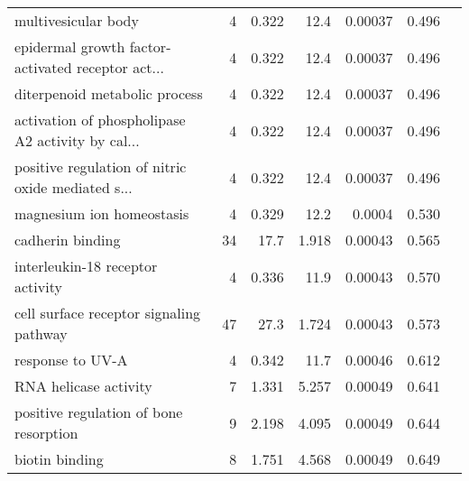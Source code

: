 \begin{longtable}{|l|r|r|r|r|r|}
                               multivesicular body &                       4 &                   0.322 &       12.4 &              0.00037 &                        0.496~~ \\
 epidermal growth factor-activated receptor act... &                       4 &                   0.322 &       12.4 &              0.00037 &                        0.496~~ \\
                     diterpenoid metabolic process &                       4 &                   0.322 &       12.4 &              0.00037 &                        0.496~~ \\
 activation of phospholipase A2 activity by cal... &                       4 &                   0.322 &       12.4 &              0.00037 &                        0.496~~ \\
 positive regulation of nitric oxide mediated s... &                       4 &                   0.322 &       12.4 &              0.00037 &                        0.496~~ \\
                         magnesium ion homeostasis &                       4 &                   0.329 &       12.2 &               0.0004 &                        0.530~~ \\
                                  cadherin binding &                      34 &                    17.7 &      1.918 &              0.00043 &                        0.565~~ \\
                  interleukin-18 receptor activity &                       4 &                   0.336 &       11.9 &              0.00043 &                        0.570~~ \\
           cell surface receptor signaling pathway &                      47 &                    27.3 &      1.724 &              0.00043 &                        0.573~~ \\
                                  response to UV-A &                       4 &                   0.342 &       11.7 &              0.00046 &                        0.612~~ \\
                             RNA helicase activity &                       7 &                   1.331 &      5.257 &              0.00049 &                        0.641~~ \\
            positive regulation of bone resorption &                       9 &                   2.198 &      4.095 &              0.00049 &                        0.644~~ \\
                                    biotin binding &                       8 &                   1.751 &      4.568 &              0.00049 &                        0.649~~ \\

\end{longtable}
